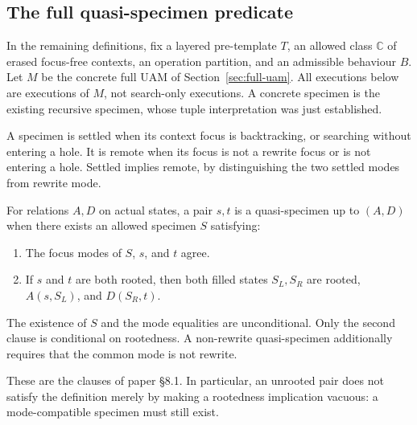 \subsection{The full quasi-specimen predicate}
In the remaining definitions, fix a layered pre-template $T$, an allowed
class $\mathbb C$ of erased focus-free contexts, an operation partition, and
an admissible behaviour $B$. Let $M$ be the concrete full UAM of
Section~\ref{sec:full-uam}. All executions below are executions of $M$, not
search-only executions. A concrete specimen is the existing recursive
specimen, whose tuple interpretation was just established.

\begin{definition}
A specimen is settled when its context focus is backtracking, or searching
without entering a hole. It is remote when its focus is not a rewrite focus
or is not entering a hole. Settled implies remote, by distinguishing the two
settled modes from rewrite mode.
\end{definition}

\begin{definition}
For relations $A,D$ on actual states, a pair $s,t$ is a quasi-specimen up to
$(A,D)$ when there exists an allowed specimen $S$ satisfying:
\begin{enumerate}
\item The focus modes of $S$, $s$, and $t$ agree.
\item If $s$ and $t$ are both rooted, then both filled states $S_L,S_R$ are
rooted, $A(s,S_L)$, and $D(S_R,t)$.
\end{enumerate}
The existence of $S$ and the mode equalities are unconditional. Only the
second clause is conditional on rootedness. A non-rewrite quasi-specimen
additionally requires that the common mode is not rewrite.
\end{definition}
These are the clauses of paper \S8.1. In particular, an unrooted pair does
not satisfy the definition merely by making a rootedness implication vacuous:
a mode-compatible specimen must still exist.

